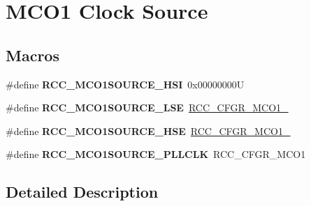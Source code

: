 \hypertarget{group___r_c_c___m_c_o1___clock___source}{}\section{M\+C\+O1 Clock Source}
\label{group___r_c_c___m_c_o1___clock___source}
\subsection*{Macros}
\begin{DoxyCompactItemize}
\item 
\mbox{\label{group___r_c_c___m_c_o1___clock___source_gad99c388c455852143220397db3730635}} 
\#define {\bfseries R\+C\+C\+\_\+\+M\+C\+O1\+S\+O\+U\+R\+C\+E\+\_\+\+H\+SI}~0x00000000U
\item 
\mbox{\label{group___r_c_c___m_c_o1___clock___source_gaa01b6cb196df3a4ad690f8bcaa4d0621}} 
\#define {\bfseries R\+C\+C\+\_\+\+M\+C\+O1\+S\+O\+U\+R\+C\+E\+\_\+\+L\+SE}~\mbox{\hyperlink{group___peripheral___registers___bits___definition_gafe73b3ad484eeecfa1556021677ecf4a}{R\+C\+C\+\_\+\+C\+F\+G\+R\+\_\+\+M\+C\+O1\+\_}}
\item 
\mbox{\label{group___r_c_c___m_c_o1___clock___source_ga5582d2ab152eb440a6cc3ae4833b043f}} 
\#define {\bfseries R\+C\+C\+\_\+\+M\+C\+O1\+S\+O\+U\+R\+C\+E\+\_\+\+H\+SE}~\mbox{\hyperlink{group___peripheral___registers___bits___definition_ga1c7e8d1da534f052ce835f06227a9b7a}{R\+C\+C\+\_\+\+C\+F\+G\+R\+\_\+\+M\+C\+O1\+\_}}
\item 
\mbox{\label{group___r_c_c___m_c_o1___clock___source_ga79d888f2238eaa4e4b8d02b3900ea18b}} 
\#define {\bfseries R\+C\+C\+\_\+\+M\+C\+O1\+S\+O\+U\+R\+C\+E\+\_\+\+P\+L\+L\+C\+LK}~R\+C\+C\+\_\+\+C\+F\+G\+R\+\_\+\+M\+C\+O1
\end{DoxyCompactItemize}


\subsection{Detailed Description}
